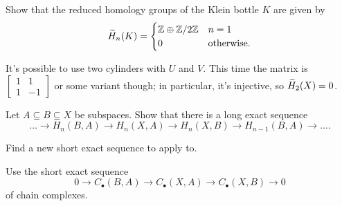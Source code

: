 \begin{sproblem}
	\gim
	Show that the reduced homology groups of the Klein bottle $K$ are given by
	\[
		\widetilde H_n(K) =
		\begin{cases}
			\mathbb Z \oplus \mathbb Z/2\mathbb Z & n = 1 \\
			0 & \text{otherwise}.
		\end{cases}
	\]
	\begin{hint}
		It's possible to use two cylinders with $U$ and $V$.
		This time the matrix is $\begin{bmatrix} 1 & 1 \\ 1 & -1 \end{bmatrix}$
		or some variant though; in particular, it's injective, so $\widetilde H_2(X) = 0$.
	\end{hint}
\end{sproblem}

\begin{sproblem}
	\label{prob:triple_long_exact}
	Let $A \subseteq B \subseteq X$ be subspaces.
	Show that there is a long exact sequence
	\[
		\dots \to H_n(B,A) \to H_n(X,A)
		\to H_n(X,B) \to H_{n-1}(B,A) \to \dots.
	\]
	\begin{hint}
		Find a new short exact sequence
		to apply  to.
	\end{hint}
	\begin{sol}
		Use the short exact sequence
		\[ 0 \to C_\bullet(B,A) \to C_\bullet(X,A) \to C_\bullet(X,B) \to 0 \]
		of chain complexes.
	\end{sol}
\end{sproblem}
